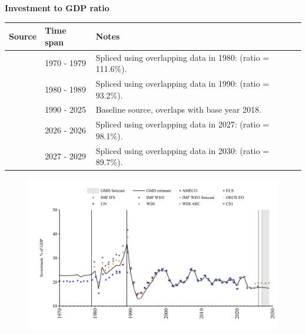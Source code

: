 \documentclass[12pt,a4paper,landscape]{article}
\begin{document}
\begin{adjustbox}{max totalsize={\paperwidth}{\paperheight},center}
\begin{minipage}[t][\textheight][t]{\textwidth}
\vspace*{0.5cm}
{}
\begin{center}
{\Large\bfseries Investment to GDP ratio}
\end{center}
\vspace{0.5cm}
\begin{table}[H]
\centering
\small
\begin{tabular}{|l|l|l|}
\hline
\textbf{Source} & \textbf{Time span} & \textbf{Notes} \\
\hline
\rowcolor{white}\cite{UN}& 1970 - 1979 &Spliced using overlapping data in 1980: (ratio = 111.6\%). \\
\rowcolor{lightgray}\cite{WDI_ARC}& 1980 - 1989 &Spliced using overlapping data in 1990: (ratio = 93.2\%). \\
\rowcolor{white}\cite{OECD_EO}& 1990 - 2025 &Baseline source, overlaps with base year 2018. \\
\rowcolor{lightgray}\cite{AMECO}& 2026 - 2026 &Spliced using overlapping data in 2027: (ratio = 98.1\%). \\
\rowcolor{white}\cite{IMF_WEO_forecast}& 2027 - 2029 &Spliced using overlapping data in 2030: (ratio = 89.7\%). \\
\hline
\end{tabular}
\end{table}
\begin{figure}[H]
\centering
\includegraphics[width=\textwidth,height=0.6\textheight,keepaspectratio]{graphs/POL_inv_GDP.pdf}
\end{figure}
\end{minipage}
\end{adjustbox}
\end{document}
